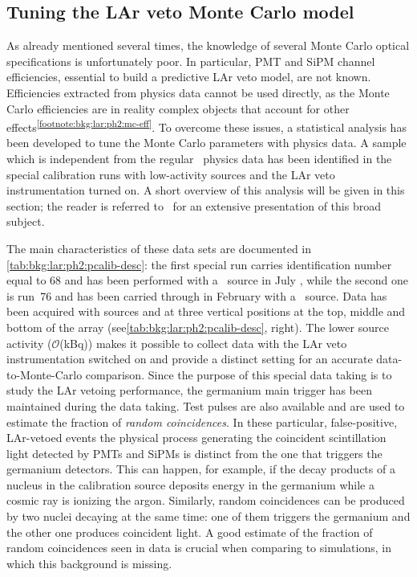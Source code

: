 \subsection{Tuning the LAr veto Monte Carlo model}%
\label{sec:bkg:lar:ph2:pcalib}

As already mentioned several times, the knowledge of several Monte Carlo optical
specifications is unfortunately poor. In particular, PMT and SiPM channel efficiencies,
essential to build a predictive LAr veto model, are not known. Efficiencies extracted from
physics data cannot be used directly, as the Monte Carlo efficiencies are in reality
complex objects that account for other
effects\textsuperscript{\ref{footnote:bkg:lar:ph2:mc-eff}}. To overcome these issues, a
statistical analysis has been developed to tune the Monte Carlo parameters with physics
data. A sample which is independent from the regular \gerda\ physics data has been
identified in the special calibration runs with low-activity sources and the LAr veto
instrumentation turned on. A short overview of this analysis will be given in this
section; the reader is referred to~\cite{Wiesinger2021} for an extensive presentation of
this broad subject.

The main characteristics of these data sets are documented in
\cref{tab:bkg:lar:ph2:pcalib-desc}: the first special run carries identification number
equal to 68 and has been performed with a \Th\ source in July , while the second one
is run~76 and has been carried through in February  with a \Ra\ source. Data has been
acquired with sources  and  at three vertical positions at the top, middle and
bottom of the array (see\cref{tab:bkg:lar:ph2:pcalib-desc}, right). The lower source
activity ($\mathcal{O}$(kBq)) makes it possible to collect data with the LAr veto
instrumentation switched on and provide a distinct setting for an accurate
data-to-Monte-Carlo comparison. Since the purpose of this special data taking is to study
the LAr vetoing performance, the germanium main trigger has been maintained during the
data taking. Test pulses are also available and are used to estimate the fraction of
\emph{random coincidences}. In these particular, false-positive, LAr-vetoed events the
physical process generating the coincident scintillation light detected by PMTs and SiPMs
is distinct from the one that triggers the germanium detectors. This can happen, for
example, if the decay products of a nucleus in the calibration source deposits energy in
the germanium while a cosmic ray is ionizing the argon. Similarly, random coincidences can
be produced by two nuclei decaying at the same time: one of them triggers the germanium
and the other one produces coincident light. A good estimate of the fraction of random
coincidences seen in data is crucial when comparing to simulations, in which this
background is missing.

